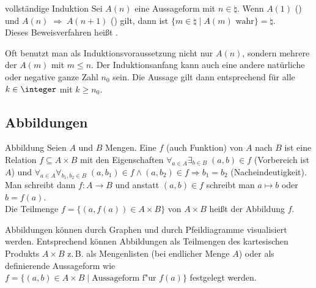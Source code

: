 \begin{Satz}{vollständige Induktion}
    Sei $A(n)$ eine Aussageform mit $n \in \natural$.
    Wenn $A(1)$ () und
    $A(n) \;\Rightarrow\; A(n + 1)$ () gilt,
    dann ist $\{m \in \natural \;|\; A(m) \text{ wahr}\} = \natural$. \\
    Dieses Beweisverfahren heißt .
\end{Satz}

\begin{Bem}
    Oft benutzt man als Induktionsvoraussetzung nicht nur $A(n)$, sondern
    mehrere der $A(m)$ mit $m \le n$.
    Der Induktionsanfang kann auch eine andere natürliche oder negative ganze
    Zahl $n_0$ sein.
    Die Aussage gilt dann entsprechend für alle $k \in \integer$ mit
    $k \ge n_0$.
\end{Bem}

\subsection{%
    Abbildungen%
}

\begin{Def}{Abbildung}
    Seien $A$ und $B$ Mengen.
    Eine  $f$ (auch Funktion) von $A$ nach $B$ ist eine
    Relation $f \subseteq A \times B$ mit den Eigenschaften
    $\forall_{a \in A} \exists_{b \in B}\; (a, b) \in f$ (Vorbereich ist $A$)
    und $\forall_{a \in A} \forall_{b_1, b_2 \in B}\;
    (a, b_1) \in f \land (a, b_2) \in f \Rightarrow b_1 = b_2$
    (Nacheindeutigkeit). \\
    Man schreibt dann $f: A \rightarrow B$ und anstatt $(a, b) \in f$ schreibt
    man $a \mapsto b$ oder $b = f(a)$. \\
    Die Teilmenge $f = \{(a, f(a)) \in A \times B\}$ von $A \times B$ heißt
     der Abbildung $f$.
\end{Def}

\begin{Bem}
    Abbildungen können durch Graphen und durch Pfeildiagramme visualisiert
    werden.
    Entsprechend können Abbildungen als Teilmengen des kartesischen Produkts
    $A \times B$ z.\,B. als Mengenlisten (bei endlicher Menge $A$) oder als
    definierende Aussageform wie \\
    $f = \{(a, b) \in A \times B \;|\; \text{Aussageform f"ur } f(a)\}$
    festgelegt werden.
\end{Bem}

